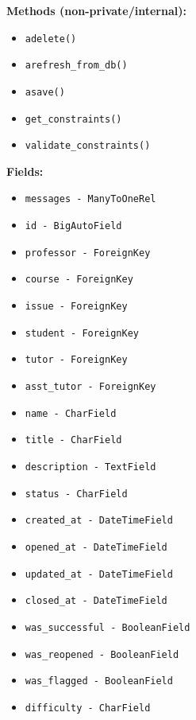 \documentclass[oneside,openany,obeyspaces]{book}
\begin{document}
\begin{flushleft}
    \textbf{Methods (non-private/internal):}
    \begin{itemize}
        \item \texttt{adelete()}
        \item \texttt{arefresh\_from\_db()}
        \item \texttt{asave()}
        \item \texttt{get\_constraints()}
        \item \texttt{validate\_constraints()}
    \end{itemize}

    \textbf{Fields:}
    \begin{itemize}
        \item \texttt{messages - ManyToOneRel}
        \item \texttt{id - BigAutoField}
        \item \texttt{professor - ForeignKey}
        \item \texttt{course - ForeignKey}
        \item \texttt{issue - ForeignKey}
        \item \texttt{student - ForeignKey}
        \item \texttt{tutor - ForeignKey}
        \item \texttt{asst\_tutor - ForeignKey}
        \item \texttt{name - CharField}
        \item \texttt{title - CharField}
        \item \texttt{description - TextField}
        \item \texttt{status - CharField}
        \item \texttt{created\_at - DateTimeField}
        \item \texttt{opened\_at - DateTimeField}
        \item \texttt{updated\_at - DateTimeField}
        \item \texttt{closed\_at - DateTimeField}
        \item \texttt{was\_successful - BooleanField}
        \item \texttt{was\_reopened - BooleanField}
        \item \texttt{was\_flagged - BooleanField}
        \item \texttt{difficulty - CharField}
    \end{itemize}


\end{flushleft}
\end{document}
